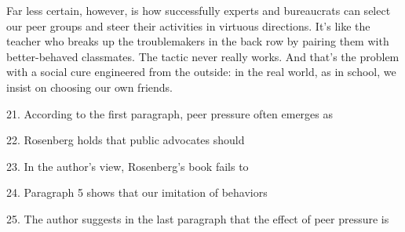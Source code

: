 \qquad Far less certain, however, is how successfully experts and bureaucrats can select our peer groups and steer their activities in virtuous directions. It's like the teacher who breaks up the troublemakers in the back row by pairing them with better-behaved classmates. The tactic never really works. And that's the problem with a social cure engineered from the outside: in the real world, as in school, we insist on choosing our own friends.

\vspace{6pt}

21. According to the first paragraph, peer pressure often emerges as\par

22. Rosenberg holds that public advocates should\par

23. In the author's view, Rosenberg's book fails to \par

24. Paragraph 5 shows that our imitation of behaviors\par

25. The author suggests in the last paragraph that the effect of peer pressure is\par
